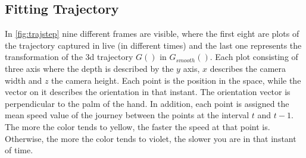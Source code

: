 \subsection{Fitting Trajectory}
\label{sec:fittraj}
In \ref{fig:trajstep} nine different frames are visible, where the first eight are plots of the trajectory captured in live (in different times) and the last one represents the transformation of the \gls{3d} trajectory $G()$ in $G_{smooth}()$. Each plot consisting of three axis where the depth is described by the $y$ axis, $x$ describes the camera width and $z$ the camera height. Each point is the position in the space, while the vector on it describes the orientation in that instant. The orientation vector is perpendicular to the palm of the hand. In addition, each point is assigned the mean speed value of the journey between the points at the interval $t$ and $t-1$. The more the color tends to yellow, the faster the speed at that point is. Otherwise, the more the color tends to violet, the slower you are in that instant of time.

